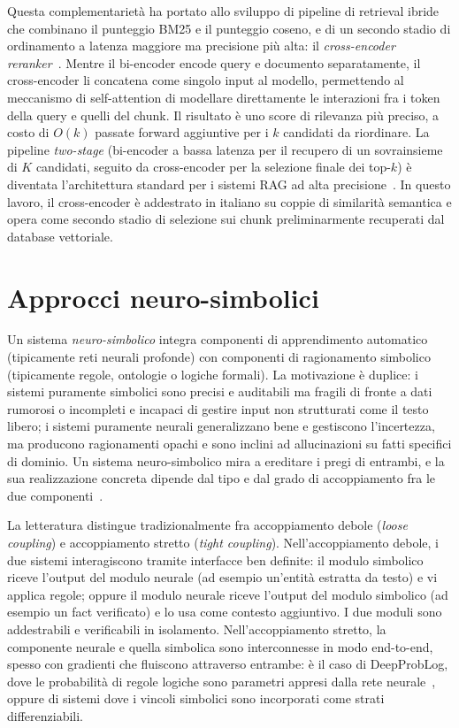 Questa complementarietà ha portato allo sviluppo di pipeline di retrieval
ibride che combinano il punteggio BM25 e il punteggio coseno, e di
un secondo stadio di ordinamento a latenza maggiore ma precisione più alta:
il \emph{cross-encoder reranker}~\cite{nogueira2019passage}. Mentre il
bi-encoder encode query e documento separatamente, il cross-encoder li
concatena come singolo input al modello, permettendo al meccanismo di
self-attention di modellare direttamente le interazioni fra i token della
query e quelli del chunk. Il risultato è uno score di rilevanza più
preciso, a costo di $O(k)$ passate forward aggiuntive per i $k$ candidati
da riordinare. La pipeline \emph{two-stage} (bi-encoder a bassa latenza
per il recupero di un sovrainsieme di $K$ candidati, seguito da cross-encoder
per la selezione finale dei top-$k$) è diventata l'architettura standard
per i sistemi RAG ad alta precisione~\cite{gao2023ragsurvey}. In questo
lavoro, il cross-encoder \reranker{} è addestrato in italiano su coppie di
similarità semantica e opera come secondo stadio di selezione sui chunk
preliminarmente recuperati dal database vettoriale.


\section{Approcci neuro-simbolici}
\label{sec:neurosymbolic}

Un sistema \emph{neuro-simbolico} integra componenti di apprendimento
automatico (tipicamente reti neurali profonde) con componenti di
ragionamento simbolico (tipicamente regole, ontologie o logiche formali).
La motivazione è duplice: i sistemi puramente simbolici sono precisi e
auditabili ma fragili di fronte a dati rumorosi o incompleti e incapaci di
gestire input non strutturati come il testo libero; i sistemi puramente
neurali generalizzano bene e gestiscono l'incertezza, ma producono ragionamenti
opachi e sono inclini ad allucinazioni su fatti specifici di dominio. Un
sistema neuro-simbolico mira a ereditare i pregi di entrambi, e la sua
realizzazione concreta dipende dal tipo e dal grado di accoppiamento fra le
due componenti~\cite{yu2023neuro}.

La letteratura distingue tradizionalmente fra accoppiamento debole
(\emph{loose coupling}) e accoppiamento stretto (\emph{tight coupling}).
Nell'accoppiamento debole, i due sistemi interagiscono tramite interfacce
ben definite: il modulo simbolico riceve l'output del modulo neurale (ad
esempio un'entità estratta da testo) e vi applica regole; oppure il modulo
neurale riceve l'output del modulo simbolico (ad esempio un fact verificato)
e lo usa come contesto aggiuntivo. I due moduli sono addestrabili e
verificabili in isolamento. Nell'accoppiamento stretto, la componente neurale
e quella simbolica sono interconnesse in modo end-to-end, spesso con
gradienti che fluiscono attraverso entrambe: è il caso di DeepProbLog, dove
le probabilità di regole logiche sono parametri appresi dalla rete
neurale~\cite{deraedt2019deepproblog}, oppure di sistemi dove i vincoli
simbolici sono incorporati come strati differenziabili.

